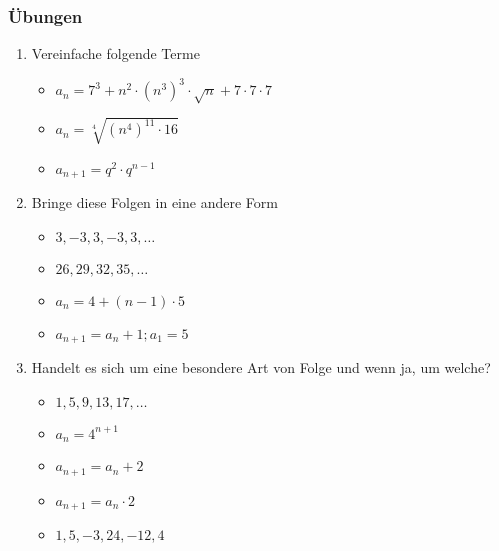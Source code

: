 \subsubsection{Übungen}
\begin{enumerate}
\item Vereinfache folgende Terme
\begin{itemize}
\item $ a_n = 7^3 + n^2 \cdot (n^3)^3 \cdot \sqrt{n} + 7 \cdot 7 \cdot 7 $
\item $ a_n = \sqrt[4]{(n^4)^{11} \cdot 16} $
\item $ a_{n+1} = q^2 \cdot q^{n-1} $
\end{itemize}
\item Bringe diese Folgen in eine andere Form
\begin{itemize}
\item $3,-3,3,-3,3,\ldots$
\item $26,29,32,35,\ldots$
\item $a_n = 4 + (n-1) \cdot 5$
\item $a_{n+1} = a_n + 1; a_1 = 5$
\end{itemize}
\item Handelt es sich um eine besondere Art von Folge und wenn ja, um welche?
\begin{itemize}
\item $1,5,9,13,17,\ldots$
\item $a_n = 4^{n+1}$
\item $a_{n+1} = a_n + 2$
\item $a_{n+1} = a_n \cdot 2$
\item $1,5,-3,24,-12,4$
\end{itemize}
\end{enumerate}